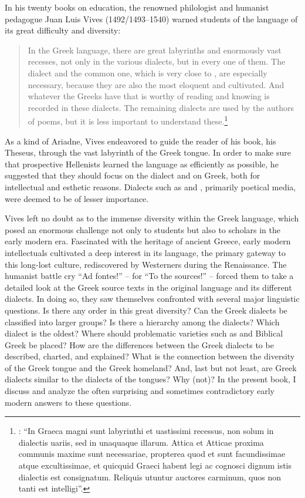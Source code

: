 \addchap{\lsPrefaceTitle}\label{ch:preface}

In his twenty books on education, the renowned  philologist and humanist pedagogue Juan Luis Vives (1492/1493–1540) warned students of the  language of its great difficulty and diversity:

\begin{quote}
In the Greek language, there are great labyrinths and enormously vast recesses, not only in the various dialects, but in every one of them. The  dialect and the common one, which is very close to , are especially necessary, because they are also the most eloquent and cultivated. And whatever the Greeks have that is worthy of reading and knowing is recorded in these dialects. The remaining dialects are used by the authors of poems, but it is less important to understand these.\footnote{\citet[e3\textsuperscript{v}]{Vives1531}: “In Graeca magni sunt labyrinthi et uastissimi recessus, non solum in dialectis uariis, sed in unaquaque illarum. Attica et Atticae proxima communis maxime sunt necessariae, propterea quod et sunt facundissimae atque excultissimae, et quicquid Graeci habent legi ac cognosci dignum istis dialectis est consignatum. Reliquis utuntur auctores carminum, quos non tanti est intelligi”.}
\end{quote}

As a kind of Ariadne, Vives endeavored to guide the reader of his book, his Theseus, through the vast labyrinth of the Greek tongue. In order to make sure that prospective Hellenists learned the language as efficiently as possible, he suggested that they should focus on the  dialect and on  Greek, both for intellectual and esthetic reasons. Dialects such as  and , primarily poetical media, were deemed to be of lesser importance.

Vives left no doubt as to the immense diversity within the Greek language, which posed an enormous challenge not only to students but also to scholars in the early modern era. Fascinated with the heritage of ancient Greece, early modern intellectuals cultivated a deep interest in its language, the primary gateway to this long-lost culture, rediscovered by Westerners during the Renaissance. The humanist battle cry “Ad fontes!” –  for “To the sources!” – forced them to take a detailed look at the Greek source texts in the original language and its different dialects. In doing so, they saw themselves confronted with several major linguistic questions. Is there any order in this great diversity? Can the Greek dialects be classified into larger groups? Is there a hierarchy among the dialects? Which dialect is the oldest? Where should problematic varieties such as  and Biblical Greek be placed? How are the differences between the Greek dialects to be described, charted, and explained? What is the connection between the diversity of the Greek tongue and the Greek homeland? And, last but not least, are Greek dialects similar to the dialects of the  tongues? Why (not)? In the present book, I discuss and analyze the often surprising and sometimes contradictory early modern answers to these questions.
